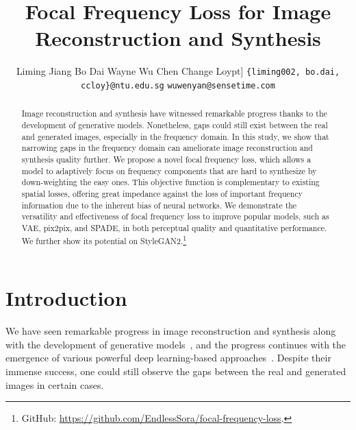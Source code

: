 \documentclass[10pt,twocolumn,letterpaper]{article}
\begin{document}
\title{Focal Frequency Loss for Image Reconstruction and Synthesis\vspace{-0.25cm}}

\author{Liming Jiang \hspace{12pt} Bo Dai \hspace{12pt} Wayne Wu \hspace{12pt} Chen Change Loy\1pt]
{\tt\small \{liming002, bo.dai, ccloy\}@ntu.edu.sg} \hspace{12pt}
{\tt\small wuwenyan@sensetime.com}
}

\maketitle





\begin{abstract}
\label{sec:abstract}

Image reconstruction and synthesis have witnessed remarkable progress thanks to the development of generative models.
Nonetheless, gaps could still exist between the real and generated images, especially in the frequency domain.
In this study, we show that narrowing gaps in the frequency domain can ameliorate image reconstruction and synthesis quality further.
We propose a novel focal frequency loss, which allows a model to adaptively focus on frequency components that are hard to synthesize by down-weighting the easy ones.
This objective function is complementary to existing spatial losses, offering great impedance against the loss of important frequency information due to the inherent bias of neural networks.
We demonstrate the versatility and effectiveness of focal frequency loss to improve popular models, such as VAE, pix2pix, and SPADE, in both perceptual quality and quantitative performance. We further show its potential on StyleGAN2.\footnote{\hspace{0.07cm}GitHub: \href{https://github.com/EndlessSora/focal-frequency-loss}{https://github.com/EndlessSora/focal-frequency-loss}.}


\end{abstract} 

\section{Introduction}
\label{sec:introduction}

We have seen remarkable progress in image reconstruction and synthesis along with the development of generative models~\cite{ae,vae,GAN,glow,pixelcnn}, and the progress continues with the emergence of various powerful deep learning-based approaches~\cite{stylegan2,SPADE,alae,nvae}. 
Despite their immense success, one could still observe the gaps between the real and generated images in certain cases.
\end{document}
